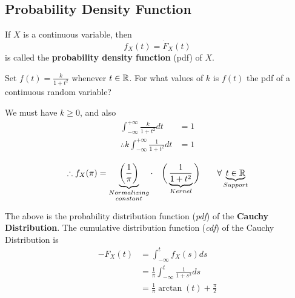 \documentclass{article}
\begin{document}
\subsection{Probability Density Function}
	\begin{defn}
		If $X$ is a continuous variable, then
		$$ f_X (t) = \dot{F}_X (t)$$
		is called the \textbf{probability density function} (pdf) of $X$.
	\end{defn}
	\begin{exmp}
		Set $f(t) = \frac{k}{1+t^2}$ whenever $t \in \mathbb{R}$. For what values of $k$ is $f(t)$ the pdf of a continuous random variable?
		\begin{sol}
			We must have $k \geq 0$, and also
			\begin{align*}
				\int_{-\infty}^{+\infty} \frac{k}{1+t^2} dt &= 1\\
				\therefore k \int_{-\infty}^{+\infty} \frac{1}{1+t^2} dt &= 1 \\
			\end{align*}
				$$
				\therefore f_X (\pi) = \underbrace{ \bigg(  \frac{1}{\pi} \bigg) }_{\substack{Normalizing \\ constant}}  \cdot \quad \bigg( \underbrace{ \frac{1}{1+t^2}}_{Kernel} \bigg) \quad \quad \forall \underbrace{t \in \mathbb{R}}_{Support}
				$$
		\end{sol}
		The above is the probability distribution function (\emph{pdf}) of the \textbf{Cauchy Distribution}. The cumulative distribution function (\emph{cdf}) of the Cauchy Distribution is
		\begin{align*}
			- F_X (t) &= \int_{- \infty}^{t} f_X (s) ds \\
			&= \frac{1}{\pi} \int_{-\infty}^{t} \frac{1}{1+s^2} ds \\
			&= \frac{1}{\pi} \arctan (t) + \frac{\pi}{2}
		\end{align*}
	\end{exmp}
\pagebreak
\end{document}
